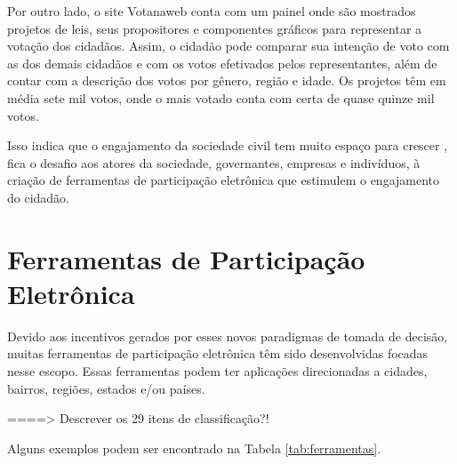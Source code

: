 \par
Por outro lado, o site Votanaweb conta com um painel onde são mostrados projetos de leis, seus propositores e componentes gráficos para representar a votação dos cidadãos.
Assim, o cidadão pode comparar sua intenção de voto com as dos demais cidadãos e com os votos efetivados pelos representantes, além de contar com a descrição dos votos por gênero, 
região e idade. Os projetos têm em média sete mil votos, onde o mais votado conta com certa de quase quinze mil votos. 

\par
Isso indica que o engajamento da sociedade civil tem muito espaço para crescer \cite{o2011government}, fica o desafio aos atores da sociedade, governantes, empresas e indivíduos,
à criação de ferramentas de participação eletrônica que estimulem o engajamento do cidadão.

\section{Ferramentas de Participação Eletrônica}
\label{sec:e-part tools}
Devido aos incentivos gerados por esses novos paradigmas de tomada de decisão, muitas ferramentas de participação eletrônica têm sido desenvolvidas focadas nesse escopo.
Essas ferramentas podem ter aplicações direcionadas a cidades, bairros, regiões, estados e/ou países. 


 ====> Descrever os 29 itens de classificação?!


Alguns exemplos podem ser encontrado na Tabela \ref{tab:ferramentas}.

